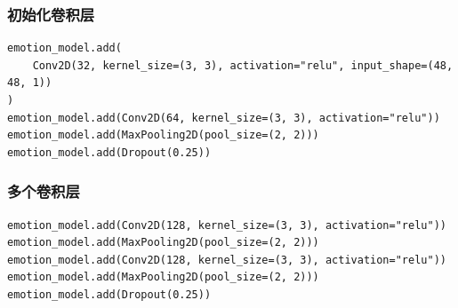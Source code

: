 \documentclass{beamer}
\begin{document}
\begin{frame}[fragile]
	\frametitle{初始化卷积层}
	\begin{verbatim}
emotion_model.add(
    Conv2D(32, kernel_size=(3, 3), activation="relu", input_shape=(48, 48, 1))
)
emotion_model.add(Conv2D(64, kernel_size=(3, 3), activation="relu"))
emotion_model.add(MaxPooling2D(pool_size=(2, 2)))
emotion_model.add(Dropout(0.25))
\end{verbatim}
\end{frame}

\begin{frame}[fragile]
	\frametitle{多个卷积层}
	\begin{verbatim}
emotion_model.add(Conv2D(128, kernel_size=(3, 3), activation="relu"))
emotion_model.add(MaxPooling2D(pool_size=(2, 2)))
emotion_model.add(Conv2D(128, kernel_size=(3, 3), activation="relu"))
emotion_model.add(MaxPooling2D(pool_size=(2, 2)))
emotion_model.add(Dropout(0.25))
\end{verbatim}
\end{frame}
\end{document}
